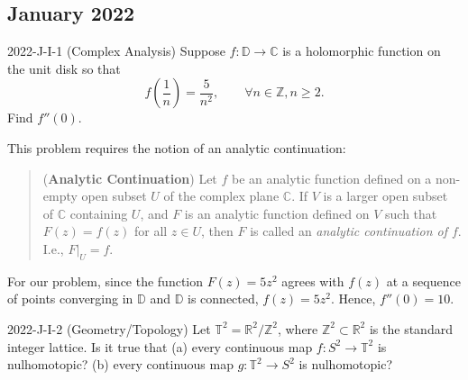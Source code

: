 \documentclass{article}
\begin{document}
\subsection{January 2022}
\begin{prb}{2022-J-I-1 (Complex Analysis)}
	Suppose $f: \mathbb{D} \to \mathbb{C}$ is a holomorphic function on the unit disk so that 
		\begin{equation*}
			f\left(\frac{1}{n}\right) = \frac{5}{n^{2}}, \qquad \forall n \in \mathbb{Z}, n \geq 2. 
		\end{equation*}
	Find $f''(0)$. 
\end{prb}
\begin{solutions}
	This problem requires the notion of an analytic continuation: 
		\begin{quote}
			(\textbf{Analytic Continuation}) Let $f$ be an analytic function defined on a non-empty open subset $U$ of the complex plane $\mathbb{C}$. If $V$ is a larger open subset of $\mathbb{C}$ containing $U$, and $F$ is an analytic function defined on $V$ such that $F(z) = f(z)$ for all $z \in U$, then $F$ is called an \textit{analytic continuation of $f$}. I.e., $F|_{U} = f$. 
		\end{quote}
	For our problem, since the function $F(z) = 5z^{2}$ agrees with $f(z)$ at a sequence of points converging in $\mathbb{D}$ and $\mathbb{D}$ is connected, $f(z) = 5z^{2}$. Hence, $f''(0) = 10$. 
\end{solutions} 
\begin{prb}{2022-J-I-2 (Geometry/Topology)}
	Let $\mathbb{T}^{2} = \mathbb{R}^{2}/\mathbb{Z}^{2}$, where $\mathbb{Z}^{2} \subset \mathbb{R}^{2}$ is the standard integer lattice. Is it true that (a) every continuous map $f: S^{2} \to \mathbb{T}^{2}$ is nulhomotopic? (b) every continuous map $g: \mathbb{T}^{2} \to S^{2}$ is nulhomotopic? 
\end{prb}
\end{document}
